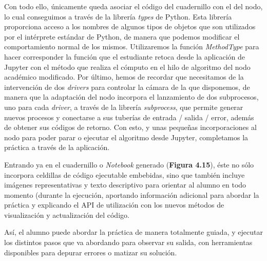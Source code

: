 Con todo ello, únicamente queda asociar el código del cuadernillo con el del nodo, lo cual conseguimos a través de la librería \textit{types} de Python. Esta librería proporciona acceso a los nombres de algunos tipos de objetos que son utilizados por el intérprete estándar de Python, de manera que podemos modificar el comportamiento normal de los mismos. Utilizaremos la función \textit{MethodType} para hacer corresponder la función que el estudiante retoca desde la aplicación de Jupyter con el método que realiza el cómputo en el hilo de algoritmo del nodo académico modificado. Por último, hemos de recordar que necesitamos de la intervención de dos \textit{drivers} para controlar la cámara de la que disponemos, de manera que la adaptación del nodo incorpora el lanzamiento de dos subprocesos, uno para cada \textit{driver}, a través de la librería \textit{subprocess}, que permite generar nuevos procesos y conectarse a sus tuberías de entrada / salida / error, además de obtener sus códigos de retorno. Con esto, y unas pequeñas incorporaciones al nodo para poder parar o ejecutar el algoritmo desde Jupyter, completamos la práctica a través de la aplicación. 

Entrando ya en el cuadernillo o \textit{Notebook} generado (\textbf{Figura 4.15}), éste no sólo incorpora celdillas de código ejecutable embebidas, sino que también incluye imágenes representativas y texto descriptivo para orientar al alumno en todo momento (durante la ejecución, aportando información adicional para abordar la práctica y explicando el API de utilización con los nuevos métodos de visualización y actualización del código. 

Así, el alumno puede abordar la práctica de manera totalmente guiada, y ejecutar los distintos pasos que va abordando para observar su salida, con herramientas disponibles para depurar errores o matizar su solución.

